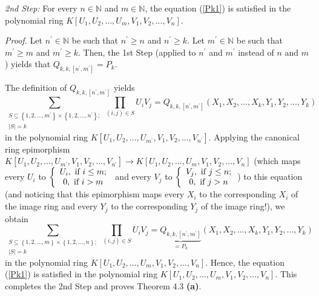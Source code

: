 \documentclass[12pt,final,notitlepage,onecolumn,german]{article}%
\begin{document}
\textit{2nd Step:} For every $n\in\mathbb{N}$ and $m\in\mathbb{N}$, the
equation (\ref{Pk1}) is satisfied in the polynomial ring $K\left[  U_{1}%
,U_{2},...,U_{m},V_{1},V_{2},...,V_{n}\right]  $.

\textit{Proof.} Let $n^{\prime}\in\mathbb{N}$ be such that $n^{\prime}\geq n$
and $n^{\prime}\geq k$. Let $m^{\prime}\in\mathbb{N}$ be such that $m^{\prime
}\geq m$ and $m^{\prime}\geq k$. Then, the 1st Step (applied to $n^{\prime}$
and $m^{\prime}$ instead of $n$ and $m$) yields that $Q_{k,k,\left[
n^{\prime},m^{\prime}\right]  }=P_{k}.$

The definition of $Q_{k,k,\left[  n^{\prime},m^{\prime}\right]  }$ yields
\[
\sum_{\substack{S\subseteq\left\{  1,2,...,m^{\prime}\right\}  \times\left\{
1,2,...,n^{\prime}\right\}  ;\\\left\vert S\right\vert =k}}\prod_{\left(
i,j\right)  \in S}U_{i}V_{j}=Q_{k,k,\left[  n^{\prime},m^{\prime}\right]
}\left(  X_{1},X_{2},...,X_{k},Y_{1},Y_{2},...,Y_{k}\right)
\]
in the polynomial ring $K\left[  U_{1},U_{2},...,U_{m^{\prime}},V_{1}%
,V_{2},...,V_{n^{\prime}}\right]  $. Applying the canonical ring epimorphism
$K\left[  U_{1},U_{2},...,U_{m^{\prime}},V_{1},V_{2},...,V_{n^{\prime}%
}\right]  \rightarrow K\left[  U_{1},U_{2},...,U_{m},V_{1},V_{2}%
,...,V_{n}\right]  $ (which maps every $U_{i}$ to $\left\{
\begin{array}
[c]{c}%
U_{i},\text{ if }i\leq m;\\
0,\text{ if }i>m
\end{array}
\right.  $ and every $V_{j}$ to $\left\{
\begin{array}
[c]{c}%
V_{j},\text{ if }j\leq n;\\
0,\text{ if }j>n
\end{array}
\right.  $) to this equation (and noticing that this epimorphism maps every
$X_{i}$ to the corresponding $X_{i}$ of the image ring and every $Y_{j}$ to
the corresponding $Y_{j}$ of the image ring!), we obtain%
\[
\sum_{\substack{S\subseteq\left\{  1,2,...,m\right\}  \times\left\{
1,2,...,n\right\}  ;\\\left\vert S\right\vert =k}}\prod_{\left(  i,j\right)
\in S}U_{i}V_{j}=\underbrace{Q_{k,k,\left[  n^{\prime},m^{\prime}\right]  }%
}_{=P_{k}}\left(  X_{1},X_{2},...,X_{k},Y_{1},Y_{2},...,Y_{k}\right)
\]
in the polynomial ring $K\left[  U_{1},U_{2},...,U_{m},V_{1},V_{2}%
,...,V_{n}\right]  $. Hence, the equation (\ref{Pk1}) is satisfied in the
polynomial ring $K\left[  U_{1},U_{2},...,U_{m},V_{1},V_{2},...,V_{n}\right]
.$ This completes the 2nd Step and proves Theorem 4.3 \textbf{(a)}.
\end{document}
